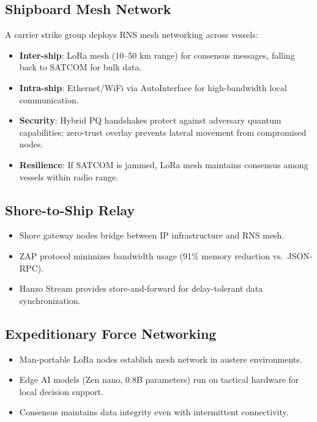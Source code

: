 \documentclass[11pt,letterpaper]{article}
\begin{document}
\subsection{Shipboard Mesh Network}

A carrier strike group deploys RNS mesh networking across vessels:

\begin{itemize}
\item \textbf{Inter-ship}: LoRa mesh (10--50 km range) for consensus messages, falling back to SATCOM for bulk data.
\item \textbf{Intra-ship}: Ethernet/WiFi via AutoInterface for high-bandwidth local communication.
\item \textbf{Security}: Hybrid PQ handshakes protect against adversary quantum capabilities; zero-trust overlay prevents lateral movement from compromised nodes.
\item \textbf{Resilience}: If SATCOM is jammed, LoRa mesh maintains consensus among vessels within radio range.
\end{itemize}

\subsection{Shore-to-Ship Relay}

\begin{itemize}
\item Shore gateway nodes bridge between IP infrastructure and RNS mesh.
\item ZAP protocol minimizes bandwidth usage (91\% memory reduction vs.\ JSON-RPC).
\item Hanzo Stream provides store-and-forward for delay-tolerant data synchronization.
\end{itemize}

\subsection{Expeditionary Force Networking}

\begin{itemize}
\item Man-portable LoRa nodes establish mesh network in austere environments.
\item Edge AI models (Zen nano, 0.8B parameters) run on tactical hardware for local decision support.
\item Consensus maintains data integrity even with intermittent connectivity.
\end{itemize}
\end{document}
